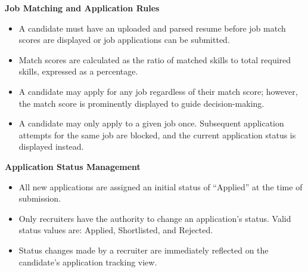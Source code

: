 \textbf{Job Matching and Application Rules}
\begin{itemize}
    \item A candidate must have an uploaded and parsed resume before job match scores are displayed or job applications can be submitted.
    \item Match scores are calculated as the ratio of matched skills to total required skills, expressed as a percentage.
    \item A candidate may apply for any job regardless of their match score; however, the match score is prominently displayed to guide decision-making.
    \item A candidate may only apply to a given job once. Subsequent application attempts for the same job are blocked, and the current application status is displayed instead.
\end{itemize}
\textbf{Application Status Management}
\begin{itemize}
    \item All new applications are assigned an initial status of ``Applied'' at the time of submission.
    \item Only recruiters have the authority to change an application's status. Valid status values are: Applied, Shortlisted, and Rejected.
    \item Status changes made by a recruiter are immediately reflected on the candidate's application tracking view.
\end{itemize}

\newpage

